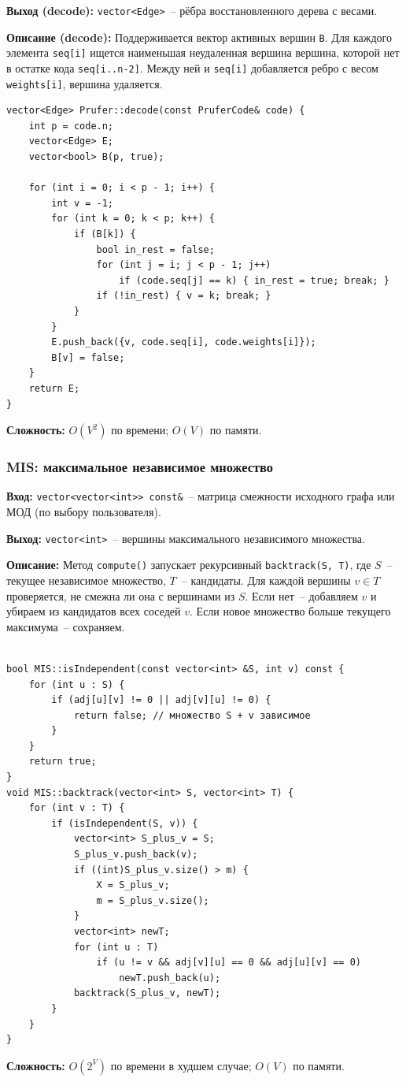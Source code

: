 \textbf{Выход (decode):} \texttt{vector<Edge>}~-- рёбра восстановленного
дерева с весами.

\textbf{Описание (decode):} Поддерживается вектор активных вершин \texttt{B}.
Для каждого элемента \texttt{seq[i]} ищется наименьшая неудаленная вершина вершина,
которой нет в остатке кода \texttt{seq[i..n-2]}.
Между ней и \texttt{seq[i]} добавляется ребро с весом \texttt{weights[i]},
вершина удаляется.

\begin{lstlisting}[style=cstyle, caption={Декодирование кода Прюфера (prufer.cpp)}]
vector<Edge> Prufer::decode(const PruferCode& code) {
    int p = code.n;
    vector<Edge> E;
    vector<bool> B(p, true);

    for (int i = 0; i < p - 1; i++) {
        int v = -1;
        for (int k = 0; k < p; k++) {
            if (B[k]) {
                bool in_rest = false;
                for (int j = i; j < p - 1; j++)
                    if (code.seq[j] == k) { in_rest = true; break; }
                if (!in_rest) { v = k; break; }
            }
        }
        E.push_back({v, code.seq[i], code.weights[i]});
        B[v] = false;
    }
    return E;
}
\end{lstlisting}

\textbf{Сложность:} $O(V^2)$ по времени; $O(V)$ по памяти.

\subsubsection{MIS: максимальное независимое множество}

\textbf{Вход:} \texttt{vector<vector<int>> const\&}~-- матрица смежности
исходного графа или МОД (по выбору пользователя).

\textbf{Выход:} \texttt{vector<int>}~-- вершины максимального
независимого множества.

\textbf{Описание:} Метод \texttt{compute()} запускает рекурсивный
\texttt{backtrack(S, T)}, где $S$~-- текущее независимое множество,
$T$~-- кандидаты. Для каждой вершины $v \in T$ проверяется, не смежна
ли она с вершинами из $S$. Если нет~-- добавляем $v$ и убираем из
кандидатов всех соседей $v$. Если новое множество больше текущего
максимума~-- сохраняем.

\begin{lstlisting}[style=cstyle, caption={Исходный код (mis.cpp)}]

bool MIS::isIndependent(const vector<int> &S, int v) const {
	for (int u : S) {
		if (adj[u][v] != 0 || adj[v][u] != 0) {
			return false; // множество S + v зависимое
		}
	}
	return true;
}
void MIS::backtrack(vector<int> S, vector<int> T) {
    for (int v : T) {
        if (isIndependent(S, v)) {
            vector<int> S_plus_v = S;
            S_plus_v.push_back(v);
            if ((int)S_plus_v.size() > m) {
                X = S_plus_v;
                m = S_plus_v.size();
            }
            vector<int> newT;
            for (int u : T)
                if (u != v && adj[v][u] == 0 && adj[u][v] == 0)
                    newT.push_back(u);
            backtrack(S_plus_v, newT);
        }
    }
}
\end{lstlisting}

\textbf{Сложность:} $O(2^V)$ по времени в худшем случае; $O(V)$ по памяти.
